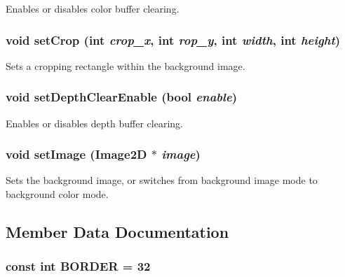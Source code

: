 Enables or disables color buffer clearing. \hypertarget{classm3g_1_1Background_e543ac6196bbe65a7af8e6b8686441a7}{
\subsubsection[{setCrop}]{\setlength{\rightskip}{0pt plus 5cm}void setCrop (int {\em crop\_\-x}, \/  int {\em rop\_\-y}, \/  int {\em width}, \/  int {\em height})}}
\label{classm3g_1_1Background_e543ac6196bbe65a7af8e6b8686441a7}


Sets a cropping rectangle within the background image. \hypertarget{classm3g_1_1Background_0953a713c22fd40cd586bcd8af80075a}{
\subsubsection[{setDepthClearEnable}]{\setlength{\rightskip}{0pt plus 5cm}void setDepthClearEnable (bool {\em enable})}}
\label{classm3g_1_1Background_0953a713c22fd40cd586bcd8af80075a}


Enables or disables depth buffer clearing. \hypertarget{classm3g_1_1Background_705b89b41cd1b38f664ed912be44baaa}{
\subsubsection[{setImage}]{\setlength{\rightskip}{0pt plus 5cm}void setImage ({\bf Image2D} $\ast$ {\em image})}}
\label{classm3g_1_1Background_705b89b41cd1b38f664ed912be44baaa}


Sets the background image, or switches from background image mode to background color mode. 

\subsection{Member Data Documentation}
\hypertarget{classm3g_1_1Background_ee380e01b33e589c24984e4c4c1c6501}{
\subsubsection[{BORDER}]{\setlength{\rightskip}{0pt plus 5cm}const int {\bf BORDER} = 32}}
\label{classm3g_1_1Background_ee380e01b33e589c24984e4c4c1c6501}


